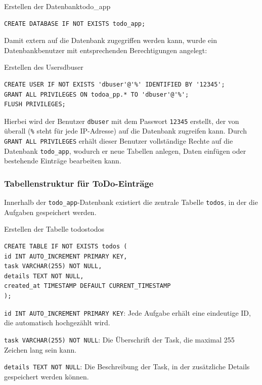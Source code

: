 \begin{code}{Erstellen der Datenbank}{todo\_app}
        \begin{verbatim}
CREATE DATABASE IF NOT EXISTS todo_app;
\end{verbatim}
\end{code}

Damit extern auf die Datenbank zugegriffen werden kann, wurde ein Datenbankbenutzer mit entsprechenden Berechtigungen angelegt:

\begin{code}{Erstellen des Users}{dbuser}
        \begin{verbatim}
CREATE USER IF NOT EXISTS 'dbuser'@'%' IDENTIFIED BY '12345';
GRANT ALL PRIVILEGES ON todoa_pp.* TO 'dbuser'@'%';
FLUSH PRIVILEGES;
\end{verbatim}
\end{code}

Hierbei wird der Benutzer \texttt{dbuser} mit dem Passwort \texttt{12345} erstellt, der von überall (\texttt{\%} steht für jede IP-Adresse) auf die Datenbank zugreifen kann. Durch \texttt{GRANT ALL PRIVILEGES} erhält dieser Benutzer vollständige Rechte auf die Datenbank \texttt{todo\_app}, wodurch er neue Tabellen anlegen, Daten einfügen oder bestehende Einträge bearbeiten kann.

\subsubsection{Tabellenstruktur für ToDo-Einträge}

Innerhalb der \texttt{todo\_app}-Datenbank existiert die zentrale Tabelle \texttt{todos}, in der die Aufgaben gespeichert werden.

\begin{code}{Erstellen der Tabelle todos}{todos}
        \begin{verbatim}
CREATE TABLE IF NOT EXISTS todos (
id INT AUTO_INCREMENT PRIMARY KEY,
task VARCHAR(255) NOT NULL,
details TEXT NOT NULL,
created_at TIMESTAMP DEFAULT CURRENT_TIMESTAMP
);
 \end{verbatim}
\end{code}

    \texttt{id INT AUTO\_INCREMENT PRIMARY KEY}: Jede Aufgabe erhält eine eindeutige ID, die automatisch hochgezählt wird.

    \texttt{task VARCHAR(255) NOT NULL}: Die Überschrift der Task, die maximal 255 Zeichen lang sein kann.

    \texttt{details TEXT NOT NULL}: Die Beschreibung der Task, in der zusätzliche Details gespeichert werden können.

